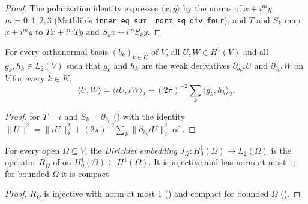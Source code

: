 \begin{proof}
\leanok
The polarization identity expresses $\langle x, y \rangle$ by the norms of $x + i^m y$,
$m = 0, 1, 2, 3$ (Mathlib's \texttt{inner\_\allowbreak eq\_\allowbreak sum\_\allowbreak
norm\_\allowbreak sq\_\allowbreak div\_\allowbreak four}), and $T$ and $S_k$ map $x + i^m y$ to
$T x + i^m T y$ and $S_k x + i^m S_k y$.
\end{proof}

\begin{lemma}
\label{lem:h1-inner-weak-gradient}
\leanok
{}
For every orthonormal basis $(b_k)_{k \in K}$ of $V$, all $U, W \in H^1(V)$ and all
$g_k, h_k \in L_2(V)$ such that $g_k$ and $h_k$ are the weak derivatives $\partial_{b_k} \iota U$
and $\partial_{b_k} \iota W$ on $V$ for every $k \in K$,
\[
  \langle U, W \rangle = \langle \iota U, \iota W \rangle_2
    + (2\pi)^{-2} \sum_k \langle g_k, h_k \rangle_2 .
\]
\end{lemma}

\begin{proof}
\leanok
{} for $T = \iota$ and $S_k = \partial_{b_k}$
() with the identity
$\|U\|^2 = \|\iota U\|_2^2 + (2\pi)^{-2} \sum_k \|\partial_{b_k} \iota U\|_2^2$ of
.
\end{proof}

\begin{definition}
\label{def:dirichlet-embedding}
\leanok
{}
For every open $\Omega \subseteq V$, the \emph{Dirichlet embedding}
$J_\Omega : H^1_0(\Omega) \to L_2(\Omega)$ is the operator $R_\Omega$ of
 on $H^1_0(\Omega) \subseteq H^1(\Omega)$. It is injective and
has norm at most $1$; for bounded $\Omega$ it is compact.
\end{definition}

\begin{proof}
\leanok
$R_\Omega$ is injective with norm at most $1$ () and compact
for bounded $\Omega$ ().
\end{proof}

